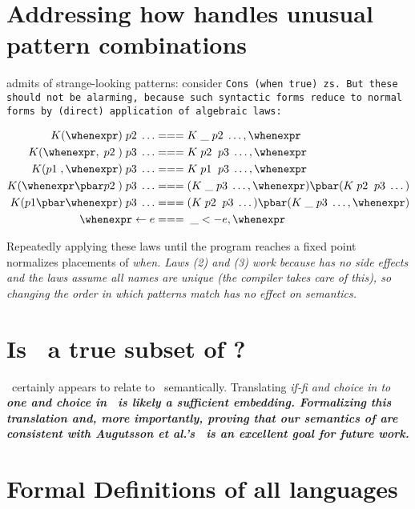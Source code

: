 \documentclass[manuscript,screen,review, 12pt, nonacm]{acmart}
\begin{document}
\section{Addressing how \PPlus handles unusual pattern combinations}
\label{ppweird}
    \PPlus admits of strange-looking patterns: consider \tt{Cons (when true)
    zs}. But these should not be alarming, because such syntactic forms reduce
    to normal forms by (direct) application of algebraic laws: 

    \begin{align}
      K (\whenexpr) \;p2\; \dots &=== K \;\_ \;p2\; \dots, \whenexpr \\
      K (\whenexpr, \;p2\;) \;p3\; \dots  &=== K \;p2\; \;p3\; \dots, \whenexpr \\
      K (p1\;, \whenexpr) \;p3\; \dots  &=== K \;p1\; \;p3\; \dots, \whenexpr \\
      K (\whenexpr \pbar p2\;) \;p3\; \dots &=== (K \;\_ \;p3\; \dots, \whenexpr) \pbar (K \;p2\; \;p3\; \dots) \\
      K (p1 \pbar \whenexpr) \;p3\; \dots &=== (K \;p2\; \;p3\; \dots) \pbar (K \;\_ \;p3\; \dots, \whenexpr)  \\
      \whenexpr \leftarrow e &=== \;\_ <- e, \whenexpr
    \end{align}   
    
    Repeatedly applying these laws until the program reaches a fixed point
    normalizes placements of \it{when}. Laws (2) and (3) work because \PPlus
    has no side effects and the laws assume all names are unique (the compiler
    takes care of this), so changing the order in which patterns match has no
    effect on semantics.         

\section{Is \VMinus\ a true subset of \VC?}
\VMinus\ certainly appears to relate to \VC\ semantically. Translating
\it{if-fi} and choice in \VMinus to \bf{one} and choice in \VC\ is likely a
sufficient embedding. Formalizing this translation and, more importantly,
proving that our semantics of \VMinus are consistent with Augutsson et al.'s
\VC\ is an excellent goal for future work. 

\section{Formal Definitions of all languages}
\label{languagedefs}
\end{document}
